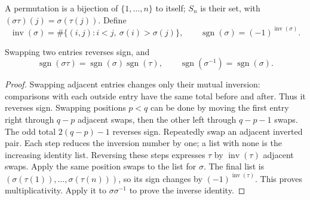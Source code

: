 A permutation is a bijection of $\{1,\ldots,n\}$ to itself; $S_n$ is
their set, with $(\sigma\tau)(j)=\sigma(\tau(j))$. Define
\[
\operatorname{inv}(\sigma)=\#\{(i,j):i<j,\ \sigma(i)>\sigma(j)\},\qquad
\operatorname{sgn}(\sigma)=(-1)^{\operatorname{inv}(\sigma)}.
\]
\begin{proposition}\label{prop:permutation-sign}
Swapping two entries reverses sign, and
\[
\operatorname{sgn}(\sigma\tau)=\operatorname{sgn}(\sigma)\operatorname{sgn}(\tau),
\qquad \operatorname{sgn}(\sigma^{-1})=\operatorname{sgn}(\sigma).
\]
\end{proposition}
\begin{proof}
Swapping adjacent entries changes only their mutual inversion: comparisons
with each outside entry have the same total before and after. Thus it
reverses sign. Swapping positions $p<q$ can be done by moving the first
entry right through $q-p$ adjacent swaps, then the other left through
$q-p-1$ swaps. The odd total $2(q-p)-1$ reverses sign.
Repeatedly swap an adjacent inverted pair. Each step reduces the inversion
number by one; a list with none is the increasing identity list. Reversing
these steps expresses $\tau$ by $\operatorname{inv}(\tau)$ adjacent swaps.
Apply the same position swaps to the list for $\sigma$. The final list is
$(\sigma(\tau(1)),\ldots,\sigma(\tau(n)))$, so its sign changes by
$(-1)^{\operatorname{inv}(\tau)}$. This proves multiplicativity.
Apply it to $\sigma\sigma^{-1}$ to prove the inverse identity.
\end{proof}

